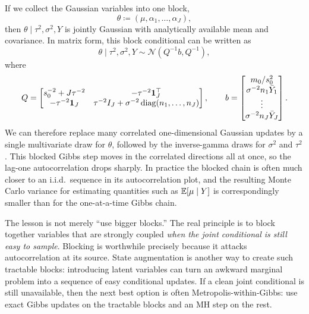 \begin{example}
If we collect the Gaussian variables into one block,
\[
  \theta \coloneqq (\mu,\alpha_1,\dots,\alpha_J),
\]
then $\theta\mid \tau^2,\sigma^2,Y$ is jointly Gaussian with analytically available mean and covariance.
In matrix form, this block conditional can be written as
\[
  \theta \mid \tau^2,\sigma^2,Y
  \sim
  \mathcal{N}(Q^{-1}b,Q^{-1}),
\]
where
\[
  Q
  =
  \begin{bmatrix}
    s_0^{-2}+J\tau^{-2} & -\tau^{-2}\mathbf{1}_J^\top \\
    -\tau^{-2}\mathbf{1}_J & \tau^{-2}I_J+\sigma^{-2}\operatorname{diag}(n_1,\dots,n_J)
  \end{bmatrix},
  \qquad
  b
  =
  \begin{bmatrix}
    m_0/s_0^2 \\
    \sigma^{-2}n_1\bar Y_1 \\
    \vdots \\
    \sigma^{-2}n_J\bar Y_J
  \end{bmatrix}.
\]
We can therefore replace many correlated one-dimensional Gaussian updates by a single multivariate draw for $\theta$, followed by the inverse-gamma draws for $\sigma^2$ and $\tau^2$.
This blocked Gibbs step moves in the correlated directions all at once, so the lag-one autocorrelation drops sharply.
In practice the blocked chain is often much closer to an i.i.d.\ sequence in its autocorrelation plot, and the resulting Monte Carlo variance for estimating quantities such as \(\mathbb{E}[\mu\mid Y]\) is correspondingly smaller than for the one-at-a-time Gibbs chain.
\end{example}

The lesson is not merely ``use bigger blocks.''
The real principle is to block together variables that are strongly coupled \emph{when the joint conditional is still easy to sample}.
Blocking is worthwhile precisely because it attacks autocorrelation at its source.
State augmentation is another way to create such tractable blocks: introducing latent variables can turn an awkward marginal problem into a sequence of easy conditional updates.
If a clean joint conditional is still unavailable, then the next best option is often Metropolis-within-Gibbs: use exact Gibbs updates on the tractable blocks and an MH step on the rest.
